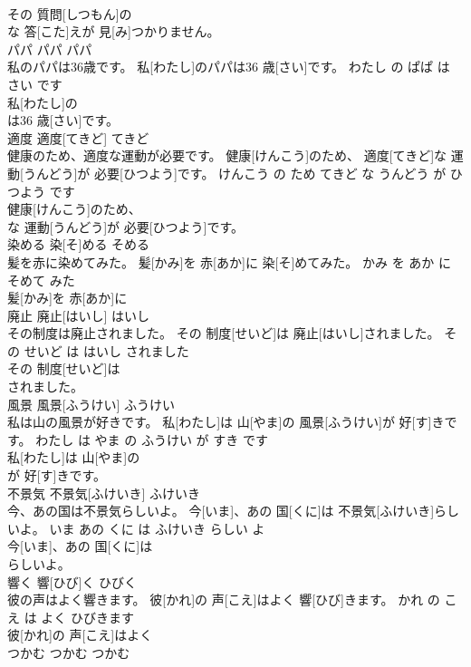 \documentclass[8pt]{extreport}
\begin{document}
\begin{CJK}{UTF8}{min}
\\	その 質問[しつもん]の
\\	な 答[こた]えが 見[み]つかりません。			
\\	パパ	パパ	パパ	
\\	私のパパは36歳です。	私[わたし]のパパは36 歳[さい]です。	わたし の ぱぱ は 
\\	さい です	
\\	私[わたし]の
\\	は36 歳[さい]です。			
\\	適度	適度[てきど]	てきど	
\\	健康のため、適度な運動が必要です。	健康[けんこう]のため、 適度[てきど]な 運動[うんどう]が 必要[ひつよう]です。	けんこう の ため てきど な うんどう が ひつよう です	
\\	健康[けんこう]のため、
\\	な 運動[うんどう]が 必要[ひつよう]です。			
\\	染める	染[そ]める	そめる	
\\	髪を赤に染めてみた。	髪[かみ]を 赤[あか]に 染[そ]めてみた。	かみ を あか に そめて みた	
\\	髪[かみ]を 赤[あか]に
\\	廃止	廃止[はいし]	はいし	
\\	その制度は廃止されました。	その 制度[せいど]は 廃止[はいし]されました。	その せいど は はいし されました	
\\	その 制度[せいど]は
\\	されました。			
\\	風景	風景[ふうけい]	ふうけい	
\\	私は山の風景が好きです。	私[わたし]は 山[やま]の 風景[ふうけい]が 好[す]きです。	わたし は やま の ふうけい が すき です	
\\	私[わたし]は 山[やま]の
\\	が 好[す]きです。			
\\	不景気	不景気[ふけいき]	ふけいき	
\\	今、あの国は不景気らしいよ。	今[いま]、あの 国[くに]は 不景気[ふけいき]らしいよ。	いま あの くに は ふけいき らしい よ	
\\	今[いま]、あの 国[くに]は
\\	らしいよ。			
\\	響く	響[ひび]く	ひびく	
\\	彼の声はよく響きます。	彼[かれ]の 声[こえ]はよく 響[ひび]きます。	かれ の こえ は よく ひびきます	
\\	彼[かれ]の 声[こえ]はよく
\\	つかむ	つかむ	つかむ	

\end{CJK}
\end{document}
